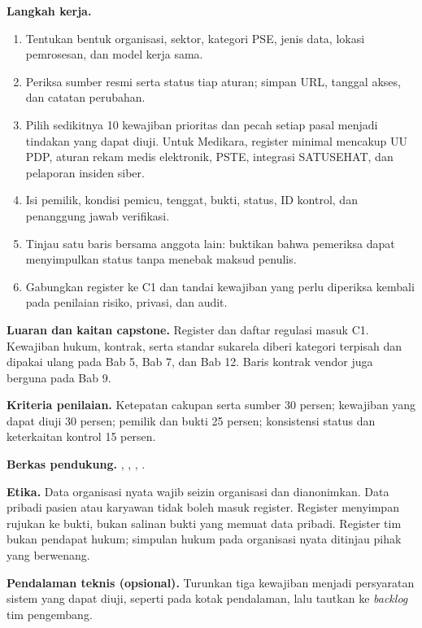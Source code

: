 \textbf{Langkah kerja.}
\begin{enumerate}
  \item Tentukan bentuk organisasi, sektor, kategori PSE, jenis data, lokasi pemrosesan, dan model kerja sama.
  \item Periksa sumber resmi serta status tiap aturan; simpan URL, tanggal akses, dan catatan perubahan.
  \item Pilih sedikitnya 10 kewajiban prioritas dan pecah setiap pasal menjadi tindakan yang dapat diuji. Untuk
  Medikara, register minimal mencakup UU PDP, aturan rekam medis elektronik, PSTE, integrasi SATUSEHAT, dan pelaporan
  insiden siber.
  \item Isi pemilik, kondisi pemicu, tenggat, bukti, status, ID kontrol, dan penanggung jawab verifikasi.
  \item Tinjau satu baris bersama anggota lain: buktikan bahwa pemeriksa dapat menyimpulkan status tanpa menebak maksud
  penulis.
  \item Gabungkan register ke C1 dan tandai kewajiban yang perlu diperiksa kembali pada penilaian risiko, privasi, dan
  audit.
\end{enumerate}

\textbf{Luaran dan kaitan capstone.} Register dan daftar regulasi masuk C1. Kewajiban hukum, kontrak, serta standar
sukarela diberi kategori terpisah dan dipakai ulang pada Bab 5, Bab 7, dan Bab 12. Baris kontrak vendor juga berguna
pada Bab 9.

\textbf{Kriteria penilaian.} Ketepatan cakupan serta sumber 30 persen; kewajiban yang dapat diuji 30 persen; pemilik
dan bukti 25 persen; konsistensi status dan keterkaitan kontrol 15 persen.

\textbf{Berkas pendukung.} ,
,
,
.

\textbf{Etika.} Data organisasi nyata wajib seizin organisasi dan dianonimkan. Data pribadi pasien atau karyawan tidak
boleh masuk register. Register menyimpan rujukan ke bukti, bukan salinan bukti yang memuat data pribadi. Register tim
bukan pendapat hukum; simpulan hukum pada organisasi nyata ditinjau pihak yang berwenang.

\textbf{Pendalaman teknis (opsional).} Turunkan tiga kewajiban menjadi persyaratan sistem yang dapat diuji, seperti pada
kotak pendalaman, lalu tautkan ke \textit{backlog} tim pengembang.

